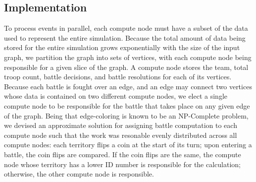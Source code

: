 \documentclass[10pt]{article}
\begin{document}
\begin{multicols}{2}
		\section*{Implementation}
		To process events in parallel, each compute node must have a subset of the data used to represent the entire simulation.  
		Because the total amount of data being stored for the entire simulation grows exponentially with the size of the input graph, we partition the graph into sets of vertices, with each compute node being responsible for a given slice of the graph.  
		A compute node stores the team, total troop count, battle decisions, and battle resolutions for each of its vertices.
		Because each battle is fought over an edge, and an edge may connect two vertices whose data is contained on two different compute nodes, we elect a single compute node to be responsible for the battle that takes place on any given edge of the graph.
		Being that edge-coloring is known to be an NP-Complete problem, we devised an approximate solution for assigning battle computation to each compute node such that the work was resonable evenly distributed across all compute nodes: each territory flips a coin at the start of its turn; upon entering a battle, the coin flips are compared.  
		If the coin flips are the same, the compute node whose territory has a lower ID number is responsible for the calculation; otherwise, the other compute node is responsible.


\end{multicols}
\end{document}
